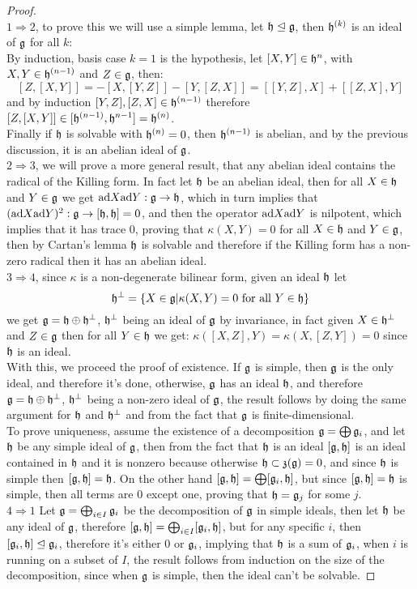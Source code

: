 \begin{proof}\\
	$1 \Rightarrow 2$, to prove this we will use a simple lemma, let $\mathfrak{h} \trianglelefteq \mathfrak{g}$, then $\mathfrak{h}^{(k)}$ is an ideal of $\mathfrak{g}$ for all $k$:\\
	By induction, basis case $k=1$ is the hypothesis, let $[X,Y] \in \mathfrak{h}^{n}$, with $X,Y \in \mathfrak{h}^{(n-1)}$ and $Z \in \mathfrak{g}$, then:
	$$[Z,[X,Y]] = -[X,[Y,Z]]-[Y,[Z,X]] = [[Y,Z],X] + [[Z,X],Y]$$
	and by induction $[Y,Z],[Z,X]\in \mathfrak{h}^{(n-1)}$ therefore $[Z,[X,Y]] \in [\mathfrak{h}^{(n-1)},\mathfrak{h}^{n-1}] = \mathfrak{h}^{(n)}$.\\
	Finally if $\mathfrak{h}$ is solvable with $\mathfrak{h}^{(n)}=0$, then $\mathfrak{h}^{(n-1)}$ is abelian, and by the previous discussion, it is an abelian ideal of $\mathfrak{g}$.\\
	$2 \Rightarrow 3$, we will prove a more general result, that any abelian ideal contains the radical of the Killing form. In fact let $\mathfrak{h}$ be an abelian ideal, then for all $X \in \mathfrak{h}$ and $Y \in \mathfrak{g}$ we get $\text{ad} X \text{ad} Y : \mathfrak{g} \rightarrow \mathfrak{h}$, which in turn implies that $(\text{ad} X \text{ad} Y)^2 : \mathfrak{g} \rightarrow [\mathfrak{h},\mathfrak{h}] = 0$, and then the operator $\text{ad} X \text{ad} Y$ is nilpotent, which implies that it has trace $0$, proving that $\kappa(X,Y)=0$ for all $X \in \mathfrak{h}$ and $Y \in \mathfrak{g}$, then by Cartan's lemma $\mathfrak{h}$ is solvable and therefore if the Killing form has a non-zero radical then it has an abelian ideal.\\
	$3 \Rightarrow 4$, since $\kappa$ is a non-degenerate bilinear form, given an ideal $\mathfrak{h}$ let $$\mathfrak{h}^\perp = \{X \in \mathfrak{g} | \kappa(X,Y)=0 \text{ for all } Y \in \mathfrak{h}\}$$ we get $\mathfrak{g} = \mathfrak{h} \oplus \mathfrak{h}^\perp$, $\mathfrak{h}^\perp$ being an ideal of $\mathfrak{g}$ by invariance, in fact given $X\in \mathfrak{h}^\perp$ and $Z \in \mathfrak{g}$ then for all $Y \in \mathfrak{h}$ we get: $\kappa([X,Z],Y) = \kappa(X,[Z,Y])=0$ since $\mathfrak{h}$ is an ideal.\\
	With this, we proceed the proof of existence. If $\mathfrak{g}$ is simple, then $\mathfrak{g}$ is the only ideal, and therefore it's done, otherwise, $\mathfrak{g}$ has an ideal $\mathfrak{h}$, and therefore $\mathfrak{g} = \mathfrak{h} \oplus \mathfrak{h}^\perp$, $\mathfrak{h}^\perp$ being a non-zero ideal of $\mathfrak{g}$, the result follows by doing the same argument for $\mathfrak{h}$ and $\mathfrak{h}^\perp$ and from the fact that $\mathfrak{g}$ is finite-dimensional.\\
	To prove uniqueness, assume the existence of a decomposition $\mathfrak{g} = \bigoplus \mathfrak{g}_i$, and let $\mathfrak{h}$ be any simple ideal of $\mathfrak{g}$, then from the fact that $\mathfrak{h}$ is an ideal $[\mathfrak{g},\mathfrak{h}]$ is an ideal contained in $\mathfrak{h}$ and it is nonzero because otherwise $\mathfrak{h}\subset \mathfrak{z}(\mathfrak{g})=0$, and since $\mathfrak{h}$ is simple then $[\mathfrak{g},\mathfrak{h}]=\mathfrak{h}$. On the other hand $[\mathfrak{g},\mathfrak{h}]=\bigoplus[\mathfrak{g}_i,\mathfrak{h}]$, but since $[\mathfrak{g},\mathfrak{h}]=\mathfrak{h}$ is simple, then all terms are $0$ except one, proving that $\mathfrak{h}=\mathfrak{g}_j$ for some $j$.\\
	$4 \Rightarrow 1$ Let $\mathfrak{g}= \bigoplus_{i \in I} \mathfrak{g}_i$ be the decomposition of $\mathfrak{g}$ in simple ideals, then let $\mathfrak{h}$ be any ideal of $\mathfrak{g}$, therefore $[\mathfrak{g},\mathfrak{h}] = \bigoplus_{i \in I} [\mathfrak{g}_i,\mathfrak{h}]$, but for any specific $i$, then $[\mathfrak{g}_i,\mathfrak{h}]\trianglelefteq \mathfrak{g}_i$, therefore it's either $0$ or $\mathfrak{g}_i$, implying that $\mathfrak{h}$ is a sum of $\mathfrak{g}_i$, when $i$ is running on a subset of $I$, the result follows from induction on the size of the decomposition, since when $\mathfrak{g}$ is simple, then the ideal can't be solvable.
\end{proof}